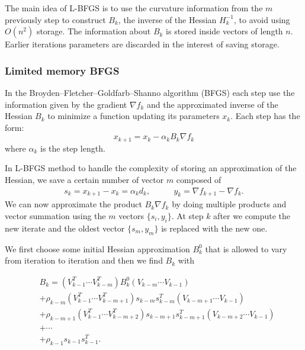 The main idea of L-BFGS is to use the curvature information from the $m$ previously step to construct $B_{k}$, the inverse of the Hessian $H_{k}^{-1}$, to avoid using $O(n^2)$ storage. The information about $B_{k}$ is stored inside vectors of length $n$. Earlier iterations parameters are discarded in the interest of saving storage.

\subsubsection{Limited memory BFGS}
\label{L-BFGS}
In the Broyden–Fletcher–Goldfarb–Shanno algorithm (BFGS) each step use the information given by the gradient $\nabla f_{k}$ and the approximated inverse of the Hessian $B_{k}$ to minimize  a function updating its parameters $x_{k}$. Each step has the form: 
\begin{equation}
x_{k+1} = x_{k} - \alpha_{k}B_{k}\nabla f_{k}
\end{equation} 
where $\alpha_{k}$ is the step length.

In L-BFGS method to handle the complexity of storing an approximation of the Hessian, we save a certain number of vector $m$ composed of 
\begin{align}
s_{k}=x_{k+1}-x_{k}=\alpha_{k}d_{k}, & \qquad
y_{k}=\nabla f_{k+1} - \nabla f_{k}.
\end{align}
We can now approximate the product $B_{k}\nabla f_{k}$ by doing multiple products and vector summation using the $m$ vectors $\{s_{i},y_{i}\}$. At step $k$ after we compute the new iterate and the oldest vector $\{s_{m},y_{m}\}$ is replaced with the new one.

We first choose some initial Hessian approximation $B^0_{k}$ that is allowed to vary from iteration to iteration and then we find $B_{k}$ with

\begin{equation} 
\begin{aligned}
&B_{k}=(V^T_{k-1}\cdots V^T_{k-m})B^0_{k}(V_{k-m}\cdots V_{k-1})\\           
&+\rho_{k-m}(V^T_{k-1}\cdots V^T_{k-m+1})s_{k-m}s^T_{k-m}(V_{k-m+1}\cdots V_{k-1})\\
&+\rho_{k-m+1}(V^T_{k-1}\cdots V^T_{k-m+2})s_{k-m+1}s^T_{k-m+1}(V_{k-m+2}\cdots V_{k-1})\\
&+ \cdots \\
&+\rho_{k-1}s_{k-1}s^T_{k-1}.  
\end{aligned}
\end{equation}

